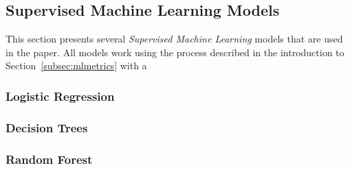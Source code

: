 \subsection{Supervised Machine Learning Models}
\label{subsec:supervised_machine_learning}

This section presents several \emph{Supervised Machine Learning} models that are used in the paper. All models work using the process described in the introduction to Section~\ref{subsec:mlmetrics} with a 

\subsubsection{Logistic Regression}
\label{subsec:logisticregression}

\subsubsection{Decision Trees}
\label{subsec:decisiontrees}

\subsubsection{Random Forest}
\label{subsec:randomforest}

